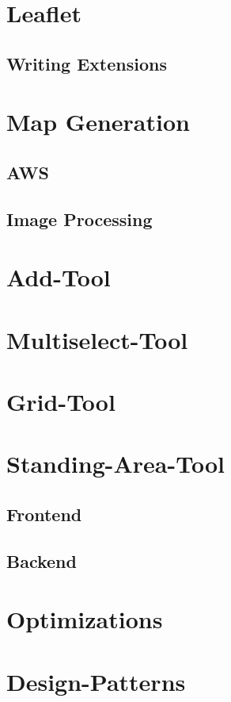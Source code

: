 \section{Leaflet}

\subsection{Writing Extensions}

\section{Map Generation}

\subsection{AWS}

\subsection{Image Processing}

\section{Add-Tool}

\section{Multiselect-Tool}

\section{Grid-Tool}

\section{Standing-Area-Tool}

\subsection{Frontend}

\subsection{Backend}

\section{Optimizations}

\section{Design-Patterns}
